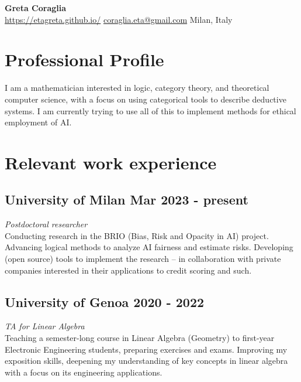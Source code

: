\documentclass[a4paper,9pt]{article}
\begin{document}
\pagestyle{empty}

\begin{center}
    \textbf{\Huge Greta Coraglia} \\
\vspace{2mm}
     \url{https://etagreta.github.io/}
	\qquad
     \href{mailto:coraglia.eta@gmail.com}{coraglia.eta@gmail.com}
	\qquad
     Milan, Italy
\end{center}


\space
\section*{ Professional Profile}
I am a mathematician interested in logic, category theory, and theoretical computer science, with a focus on using categorical tools to describe deductive systems. I am currently trying to use all of this to implement methods for ethical employment of AI.

\section*{ Relevant work experience}

\subsection*{University of Milan \hfill Mar 2023 - present}
\textit{ Postdoctoral researcher} \\
Conducting research in the BRIO (Bias, Risk and Opacity in AI) project. Advancing logical methods to analyze AI fairness and estimate risks. Developing (open source) tools to implement the research -- in collaboration with private companies interested in their applications to credit scoring and such.%

\subsection*{University of Genoa \hfill 2020 - 2022}
\textit{TA for Linear Algebra}\\
Teaching a semester-long course in Linear Algebra (Geometry) to first-year Electronic Engineering students, preparing exercises and exams. Improving my exposition skills, deepening my understanding of key concepts in linear algebra with a focus on its engineering applications.
\end{document}
